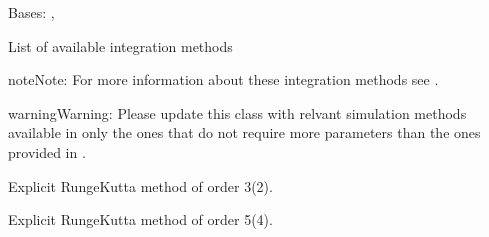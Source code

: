 \documentclass[a4paper,landscape,10pt,english]{sphinxmanual}
\begin{document}
\begin{fulllineitems}
\label{\detokenize{code_docs/simulation_API.controller:simulation_API.controller.schemas.IntegrationMethods}}
Bases: , 

List of available integration methods

\begin{sphinxadmonition}{note}{Note:}
For more information about these integration methods see
.
\end{sphinxadmonition}

\begin{sphinxadmonition}{warning}{Warning:}
Please update this class with relvant simulation methods available in
 \textendash{}only the ones that do not require more
parameters than the ones provided in
{\hyperref[\detokenize{code_docs/simulation_API.controller:simulation_API.controller.schemas.SimRequest}]{}}.
\end{sphinxadmonition}

\begin{fulllineitems}
\label{\detokenize{code_docs/simulation_API.controller:simulation_API.controller.schemas.IntegrationMethods.RK23}}
Explicit Runge\sphinxhyphen{}Kutta method of order 3(2).

\end{fulllineitems}


\begin{fulllineitems}
\label{\detokenize{code_docs/simulation_API.controller:simulation_API.controller.schemas.IntegrationMethods.RK45}}
Explicit Runge\sphinxhyphen{}Kutta method of order 5(4).

\end{fulllineitems}


\end{fulllineitems}
\end{document}
